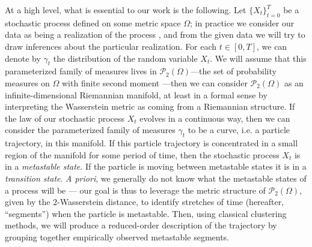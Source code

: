 \documentclass{article}
\begin{document}
At a high level, what is essential to our work is the following. Let \(\{X_t\}_{t=0}^T\) be a stochastic process defined on some metric space \(\Omega\); in practice we consider our data as being a realization of the process \cite{oksendalStochasticDifferentialEquations2010}, and from the given data we will try to draw inferences about the particular realization. For each \(t \in [0, T]\), we can denote by \(\gamma_t\) the distribution of the random variable \(X_t\). We will assume that this parameterized family of measures lives in \(\mathcal{P}_2(\Omega)\)---the set of probability measures on \(\Omega\) with finite second moment ---then we can consider \(\mathcal{P}_2(\Omega)\) as an infinite-dimensional Riemannian manifold, at least in a formal sense by interpreting the Wasserstein metric as coming from a Riemannian structure. If the law of our stochastic process \(X_t\) evolves in a continuous way, then we can consider the parameterized family of measures \(\gamma_t\) to be a curve, i.e. a particle trajectory, in this manifold. If this particle trajectory is concentrated in a small region of the manifold for some period of time, then the stochastic process \(X_t\) is in a \textit{metastable state}. If the particle is moving between metastable states it is in a \textit{transition state}. \textit{A priori}, we generally do not know what the metastable states of a process will be --- our goal is thus to leverage the metric structure of \(\mathcal{P}_2(\Omega)\), given by the \(2\)-Wasserstein distance, to identify stretches of time (hereafter, ``segments'') when the particle is metastable. Then, using classical clustering methods, we will produce a reduced-order description of the trajectory by grouping together empirically observed metastable segments. 
\end{document}
